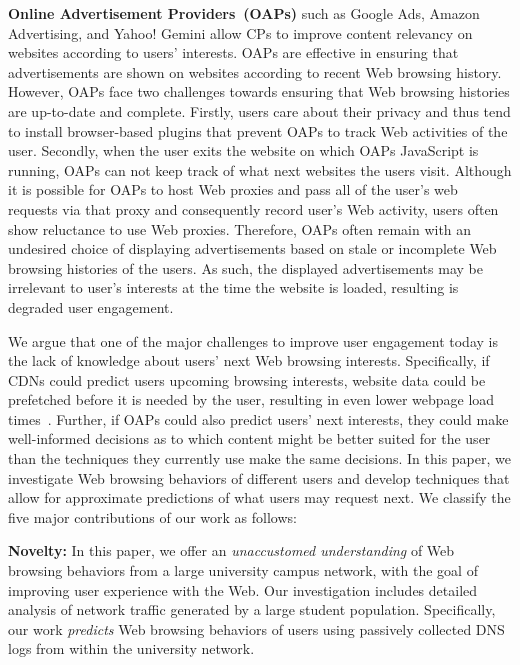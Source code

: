 \documentclass[letterpaper,twocolumn]{article}
\begin{document}
\textbf{Online Advertisement Providers~(OAPs)} such as Google Ads, Amazon Advertising, and Yahoo! Gemini allow CPs to improve content relevancy on websites according to users' interests.
OAPs are effective in ensuring that advertisements are shown on websites according to recent Web browsing history. 
However, OAPs face two challenges towards ensuring that Web browsing histories are up-to-date and complete.
Firstly, users care about their privacy and thus tend to install browser-based plugins that prevent OAPs to track Web activities of the user.
Secondly, when the user exits the website on which OAPs JavaScript is running, OAPs can not keep track of what next websites the users visit.
Although it is possible for OAPs to host Web proxies and pass all of the user's web requests via that proxy and consequently record user's Web activity, users often show reluctance to use Web proxies.
Therefore, OAPs often remain with an undesired choice of displaying advertisements based on stale or incomplete Web browsing histories of the users.
As such, the displayed advertisements may be irrelevant to user's interests at the time the website is loaded, resulting is degraded user engagement.




We argue that one of the major challenges to improve user engagement today is the lack of knowledge about users' next Web browsing interests.
Specifically, if CDNs could predict users upcoming browsing interests, website data could be prefetched before it is needed by the user, resulting in even lower webpage load times~\cite{msdn:dns-prefetch,ShangPiggy06}.
Further, if OAPs could also predict users' next interests, they could make well-informed decisions as to which content might be better suited for the user than the techniques they currently use make the same decisions.
In this paper, we investigate Web browsing behaviors of different users and develop techniques that allow for approximate predictions of what users may request next.
We classify the five major contributions of our work as follows:


\noindent
\textbf{Novelty:} In this paper, we offer an \textit{unaccustomed understanding} of Web browsing behaviors from a large university campus network, with the goal of improving user experience with the Web.
Our investigation includes detailed analysis of network traffic generated by a large student population.
Specifically, our work \textit{predicts} Web browsing behaviors of users using passively collected DNS logs from within the university network.
\end{document}
